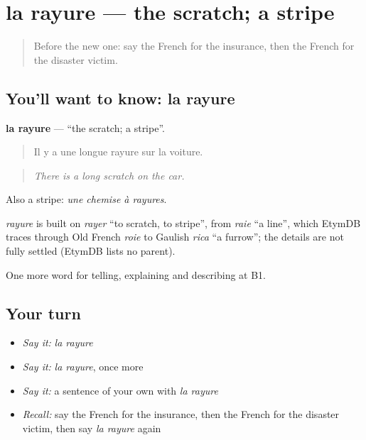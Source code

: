 \section[la rayure]{la rayure — the scratch; a stripe}

\label{lesson:FR-C307-rayure}



\begin{quote}
Before the new one: say the French for the insurance, then the French for the disaster victim.
\end{quote}

\subsection*{You'll want to know: la rayure}
\textbf{la rayure} — \textquotedblleft{}the scratch; a stripe\textquotedblright{}.

\begin{quote}
Il y a une longue rayure sur la voiture.
\end{quote}

\begin{quote}
\emph{There is a long scratch on the car.}
\end{quote}

Also a stripe: \emph{une chemise à rayures}.

\begin{cousinweb}
\emph{rayure} is built on \emph{rayer} \textquotedblleft{}to scratch, to stripe\textquotedblright{}, from \emph{raie} \textquotedblleft{}a line\textquotedblright{}, which EtymDB traces through Old French \emph{roie} to Gaulish \emph{rica} \textquotedblleft{}a furrow\textquotedblright{}; the details are not fully settled (EtymDB lists no parent).
\end{cousinweb}

\begin{grammarlens}[title={What you've built}]
One more word for telling, explaining and describing at B1.
\end{grammarlens}

\subsection*{Your turn}
\begin{itemize}
\raggedright
  \item \emph{Say it:} \emph{la rayure}
  \item \emph{Say it:} \emph{la rayure}, once more
  \item \emph{Say it:} a sentence of your own with \emph{la rayure}
  \item \emph{Recall:} say the French for the insurance, then the French for the disaster victim, then say \emph{la rayure} again
\end{itemize}

